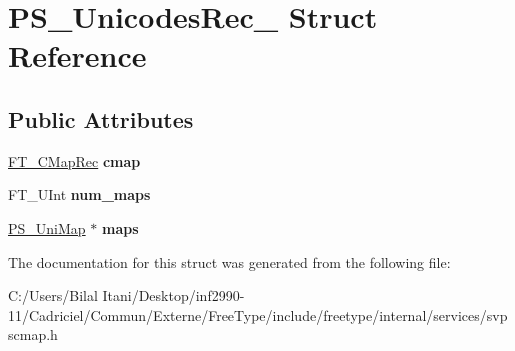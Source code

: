 \hypertarget{struct_p_s___unicodes_rec__}{}\section{P\+S\+\_\+\+Unicodes\+Rec\+\_\+ Struct Reference}
\label{struct_p_s___unicodes_rec__}
\subsection*{Public Attributes}
\begin{DoxyCompactItemize}
\item 
\hyperlink{struct_f_t___c_map_rec__}{F\+T\+\_\+\+C\+Map\+Rec} {\bfseries cmap}\hypertarget{struct_p_s___unicodes_rec___a4c3e28cb86c8a7039107437dcf995da7}{}\label{struct_p_s___unicodes_rec___a4c3e28cb86c8a7039107437dcf995da7}

\item 
F\+T\+\_\+\+U\+Int {\bfseries num\+\_\+maps}\hypertarget{struct_p_s___unicodes_rec___abbc3617f13363ddcf851ee229752b08d}{}\label{struct_p_s___unicodes_rec___abbc3617f13363ddcf851ee229752b08d}

\item 
\hyperlink{struct_p_s___uni_map__}{P\+S\+\_\+\+Uni\+Map} $\ast$ {\bfseries maps}\hypertarget{struct_p_s___unicodes_rec___abd0ff1abe19a2a6a838b631ec81d22cd}{}\label{struct_p_s___unicodes_rec___abd0ff1abe19a2a6a838b631ec81d22cd}

\end{DoxyCompactItemize}


The documentation for this struct was generated from the following file\+:\begin{DoxyCompactItemize}
\item 
C\+:/\+Users/\+Bilal Itani/\+Desktop/inf2990-\/11/\+Cadriciel/\+Commun/\+Externe/\+Free\+Type/include/freetype/internal/services/svpscmap.\+h\end{DoxyCompactItemize}
